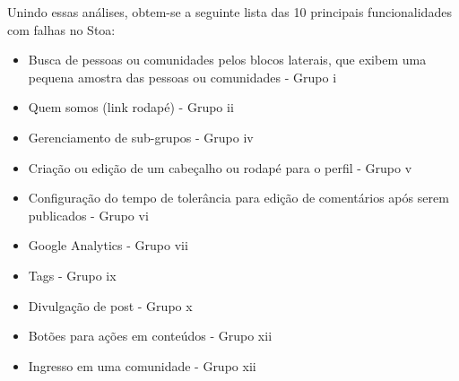     Unindo essas análises, obtem-se a seguinte lista das 10 principais funcionalidades com falhas no Stoa:
    \begin{itemize}
    \item Busca de pessoas ou comunidades pelos blocos laterais, que exibem uma pequena amostra das pessoas ou comunidades - Grupo i
    \item Quem somos (link rodapé) - Grupo ii
    \item Gerenciamento de sub-grupos - Grupo iv
    \item Criação ou edição de um cabeçalho ou rodapé para o perfil - Grupo v
    \item Configuração do tempo de tolerância para edição de comentários após serem publicados - Grupo vi
    \item Google Analytics - Grupo  vii
    \item Tags - Grupo ix
    \item Divulgação de post - Grupo x
    \item Botões para ações em conteúdos - Grupo xii
    \item Ingresso em uma comunidade - Grupo xii
    \end{itemize}
    